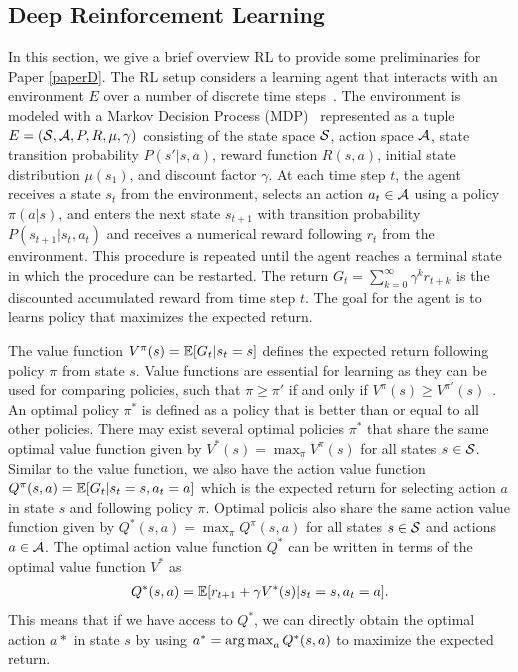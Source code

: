 \subsection{Deep Reinforcement Learning}\label{sec:deep_rl}


In this section, we give a brief overview RL to provide some preliminaries for Paper \ref{paperD}. The RL setup considers a learning agent that interacts with an environment $E$ over a number of discrete time steps~\cite{sutton2018reinforcement}. The environment is modeled with a Markov Decision Process (MDP)~\cite{bellman1957markovian} represented as a tuple $E = ({\mathcal{S}}, {\mathcal{A}}, P, R, \mu, \gamma)$ consisting of the state space ${\mathcal{S}}$, action space ${\mathcal{A}}$, state transition probability $P(s' | s, a)$, reward function $R(s, a)$, initial state distribution $\mu(s_1)$, and discount factor $\gamma$. At each time step $t$, the agent receives a state $s_t$ from the environment, selects an action $a_t \in {\mathcal{A}}$ using a policy $\pi(a | s)$, and enters the next state $s_{t+1}$ with transition probability $P(s_{t+1} | s_t, a_t)$ and receives a numerical reward following $r_t$ from the environment. This procedure is repeated until the agent reaches a terminal state in which the procedure can be restarted. The return $G_t = \sum_{k=0}^{\infty} \gamma^{k} r_{t+k}$ is the discounted accumulated reward from time step $t$. The goal for the agent is to learns policy that maximizes the expected return. 

The value function $V^{\pi}(s) = \mathbb{E}[G_t | s_t=s]$ defines the expected return following policy $\pi$ from state $s$. Value functions are essential for learning as they can be used for comparing policies, such that $\pi \geq \pi'$ if and only if $V^{\pi}(s) \geq V^{\pi'}(s)$~\cite{sutton2018reinforcement}. An optimal policy $\pi^{*}$ is defined as a policy that is better than or equal to all other policies. There may exist several optimal policies $\pi^{*}$ that share the same optimal value function given by $V^{*}(s) = \max_{\pi} V^{\pi}(s)$ for all states $s \in {\mathcal{S}}$. 
Similar to the value function, we also have the action value function $Q^{\pi}(s, a) = \mathbb{E}[G_t | s_t=s, a_t=a]$ which is the expected return for selecting action $a$ in state $s$ and following policy $\pi$. Optimal policis also share the same action value function given by $Q^{*}(s, a) = \max_{\pi} Q^{\pi}(s, a)$ for all states $s \in {\mathcal{S}}$ and actions $a \in {\mathcal{A}}$. The optimal action value function $Q^{*}$ can be written in terms of the optimal value function $V^{*}$ as
\begin{align}
	Q^{*}(s, a) = \mathbb{E}[r_{t+1} + \gamma V^{*}(s) | s_t=s, a_t=a]. 
\end{align}
This means that if we have access to $Q^{*}$, we can directly obtain the optimal action $a*$ in state $s$ by using $a^{*} = \operatorname*{arg\,max}_{a} Q^{*}(s, a)$ to maximize the expected return. 


